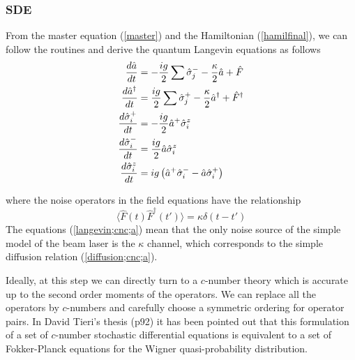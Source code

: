 \documentclass{article}
\begin{document}
\subsubsection{SDE}
From the master equation (\ref{master}) and the Hamiltonian (\ref{hamilfinal}), we can follow the routines and derive the quantum Langevin equations as follows
\begin{align}
\notag 
    \frac{d \hat{a}}{dt} &= -\frac{ig}{2}\sum\hat{\sigma}_j^--\frac{\kappa}{2}\hat{a}+\hat{F}\\\notag
    \frac{d \hat{a}^\dagger}{dt} &= \frac{ig}{2}\sum\hat{\sigma}_j^+-\frac{\kappa}{2}\hat{a}^\dagger+\hat{F}^{\dagger}\\
    \label{langevin;cnc;a}
    \frac{d \hat{\sigma}_i^+}{dt} &= -\frac{ig}{2}\hat{a}^+\hat{\sigma}^z_i\\\notag
    \frac{d \hat{\sigma}_i^-}{dt} &= \frac{ig}{2}\hat{a}\hat{\sigma}^z_i\\\notag
    \frac{d \hat{\sigma}_i^z}{dt} &= ig\left(\hat{a}^+\hat{\sigma}^-_i-\hat{a}\hat{\sigma}_i^+\right)
\end{align}

where the noise operators in the field equations have the relationship
\begin{equation}
\label{diffusion;cnc;a}
    \langle \hat{F}(t) \hat{F}^{\dagger}(t')\rangle = \kappa \delta (t-t')
\end{equation}
The equations (\ref{langevin;cnc;a}) mean that the only noise source of the simple model of the beam laser is the $\kappa$ channel, which corresponds to the simple diffusion relation (\ref{diffusion;cnc;a}).

Ideally, at this step we can directly turn to a $c$-number theory which is accurate up to the second order moments of the operators. We can replace all the operators by $c$-numbers and carefully choose a symmetric ordering for operator pairs. In David Tieri's thesis (p92) it has been pointed out that this formulation of a set of $c$-number stochastic differential equations is equivalent to a set of Fokker-Planck equations for the Wigner quasi-probability distribution.
\end{document}
